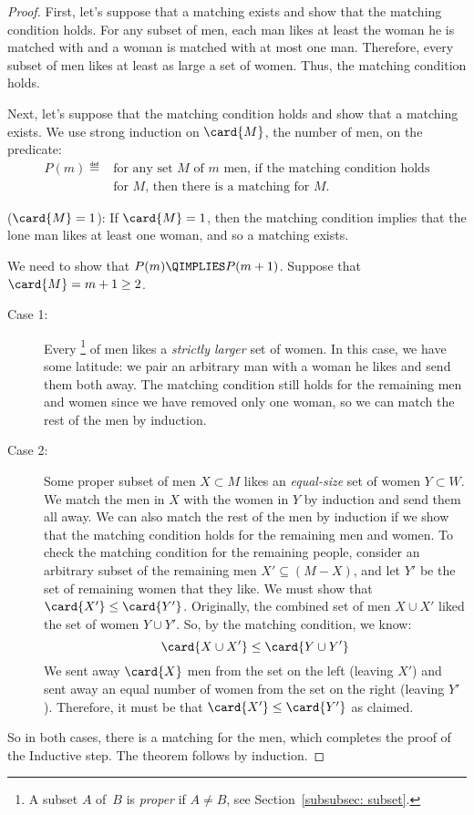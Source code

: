 \begin{proof}
  First, let's suppose that a matching exists and show that the matching
  condition holds.  For any subset of men, each man likes at least the
  woman he is matched with and a woman is matched with at most one man.
  Therefore, every subset of men likes at least as large a set of women.
  Thus, the matching condition holds.

Next, let's suppose that the matching condition holds and show that a
matching exists.  We use strong induction on $\card{M}$, the number of
men, on the predicate:
\begin{align*}
    P(m) \eqdef & \text{for any set~$M$ of $m$ men, if the matching
      condition holds} \\
             & \text{for~$M$, then there is a matching for~$M$.}
\end{align*}

 ($\card{M}=1$): If $\card{M} = 1$, then the
matching condition implies that the lone man likes at least one woman,
and so a matching exists.

 We need to show that $P(m) \QIMPLIES
P(m + 1)$.  Suppose that $\card{M} = m + 1 \ge 2$.
\begin{description}

\item[Case 1:] Every \footnote{A subset $A$ of~$B$ is
    \emph{proper} if $A \ne B$, see Section~\ref{subsubsec: subset}.} of
  men likes a \emph{strictly larger} set of women.  In this case, we have
  some latitude: we pair an arbitrary man with a woman he likes and send
  them both away.  The matching condition still holds for the remaining
  men and women since we have removed only one woman, so we can match the
  rest of the men by induction.

\item[Case 2:] Some proper subset of men $X \subset M$ likes an
  \emph{equal-size} set of women $Y \subset W$.  We match the men in
  $X$ with the women in $Y$ by induction and send them all away.  We
  can also match the rest of the men by induction if we show that the
  matching condition holds for the remaining men and women.  To check
  the matching condition for the remaining people, consider an
  arbitrary subset of the remaining men $X' \subseteq (M - X)$, and
  let $Y'$ be the set of remaining women that they like.  We must show
  that $\card{X'} \leq \card{Y'}$.  Originally, the combined set of
  men $X \cup X'$ liked the set of women $Y \cup Y'$.  So, by the
  matching condition, we know:
%
  \begin{equation*}
  \card{X \cup X'}  \leq  \card{Y \cup Y'}
  \end{equation*}
%
  We sent away $\card{X}$ men from the set on the left (leaving $X'$)
  and sent away an equal number of women from the set on the right
  (leaving $Y'$).  Therefore, it must be that $\card{X'} \leq
  \card{Y'}$ as claimed.
\end{description}

So in both cases, there is a matching for the men, which completes the
proof of the Inductive step.  The theorem follows by induction.
\end{proof}

